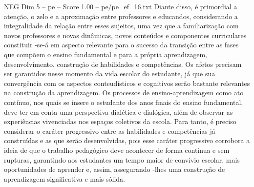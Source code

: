 \begin{textsample}{NEG Dim 5 – pe – Score 1.00 – pe/pe\_ef\_16.txt}
Diante disso, é primordial a atenção, o zelo e a aproximação entre professores e educandos, considerando a integralidade da relação entre esses sujeitos, uma vez que a familiarização com novos professores e novas dinâmicas, novos conteúdos e componentes curriculares constituir -se-á em aspecto relevante para o sucesso da transição entre as fases que compõem o ensino fundamental e para a própria aprendizagem, desenvolvimento, construção de habilidades e competências.
Os afetos precisam ser garantidos nesse momento da vida escolar do estudante, já que sua convergência com os aspectos conteudísticos e cognitivos serão bastante relevantes na construção da aprendizagem.
Os processos de ensino-aprendizagem como ato contínuo, nos quais se insere o estudante dos anos finais do ensino fundamental, deve ter em conta uma perspectiva dialética e dialógica, além de observar as experiências vivenciadas nos espaços coletivos da escola.
Para tanto, é preciso considerar o caráter progressivo entre as habilidades e competências já construídas e as que serão desenvolvidas, pois esse caráter progressivo corrobora a ideia de que o trabalho pedagógico deve acontecer de forma contínua e sem rupturas, garantindo aos estudantes um tempo maior de convívio escolar, mais oportunidades de aprender e, assim, assegurando -lhes uma construção de aprendizagem significativa e mais sólida.

\end{textsample}
